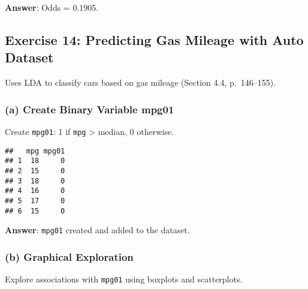 \documentclass[
]{article}
\newenvironment{Shaded}{\begin{snugshade}}{\end{snugshade}}
\newcommand{\DecValTok}[1]{\textcolor[rgb]{0.00,0.00,0.81}{#1}}
\newcommand{\FunctionTok}[1]{\textcolor[rgb]{0.13,0.29,0.53}{\textbf{#1}}}
\newcommand{\NormalTok}[1]{#1}
\newcommand{\OtherTok}[1]{\textcolor[rgb]{0.56,0.35,0.01}{#1}}
\newcommand{\SpecialCharTok}[1]{\textcolor[rgb]{0.81,0.36,0.00}{\textbf{#1}}}
\newcommand{\StringTok}[1]{\textcolor[rgb]{0.31,0.60,0.02}{#1}}
\begin{document}
\textbf{Answer}: Odds = 0.1905.

\subsection{Exercise 14: Predicting Gas Mileage with Auto
Dataset}\label{exercise-14-predicting-gas-mileage-with-auto-dataset}

Uses LDA to classify cars based on gas mileage (Section 4.4,
p.~146--155).

\subsubsection{(a) Create Binary Variable
mpg01}\label{a-create-binary-variable-mpg01}

Create \texttt{mpg01}: 1 if \texttt{mpg} \textgreater{} median, 0
otherwise.

\begin{Shaded}
\end{Shaded}

\begin{verbatim}
##   mpg mpg01
## 1  18     0
## 2  15     0
## 3  18     0
## 4  16     0
## 5  17     0
## 6  15     0
\end{verbatim}

\textbf{Answer}: \texttt{mpg01} created and added to the dataset.

\subsubsection{(b) Graphical Exploration}\label{b-graphical-exploration}

Explore associations with \texttt{mpg01} using boxplots and
scatterplots.
\end{document}
